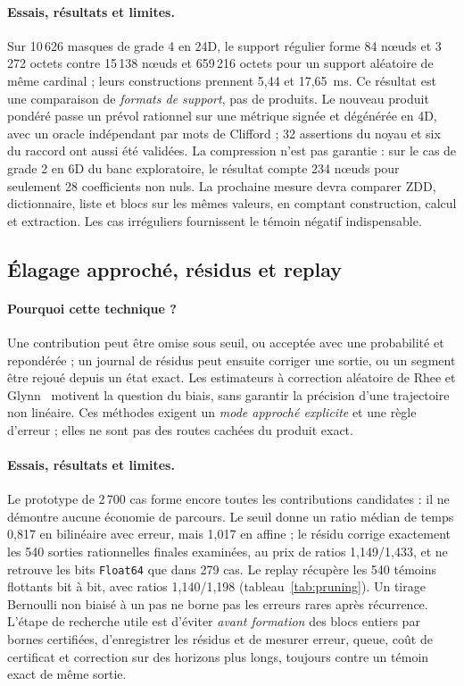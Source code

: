\documentclass[11pt,a4paper]{article}
\newcommand{\code}[1]{\texttt{#1}}
\begin{document}
\paragraph{Essais, résultats et limites.}
Sur 10\,626 masques de grade 4 en 24D, le support régulier forme
84 nœuds et 3\,272 octets contre 15\,138 nœuds et 659\,216 octets pour
un support aléatoire de même cardinal ; leurs constructions prennent
5,44 et 17,65~ms. Ce résultat est une comparaison de
\emph{formats de support}, pas de produits. Le nouveau produit pondéré passe
un prévol rationnel sur une métrique signée et dégénérée en 4D, avec un
oracle indépendant par mots de Clifford ; 32 assertions du noyau et six
du raccord ont aussi été validées. La compression n'est pas garantie :
sur le cas de grade 2 en 6D du banc exploratoire, le résultat compte
234 nœuds pour seulement 28 coefficients non nuls. La prochaine mesure
devra comparer ZDD, dictionnaire, liste et blocs sur les mêmes valeurs,
en comptant construction, calcul et extraction. Les cas irréguliers
fournissent le témoin négatif indispensable.

\subsection{Élagage approché, résidus et replay}
\paragraph{Pourquoi cette technique ?}
Une contribution peut être omise sous seuil, ou acceptée avec une probabilité
et repondérée ; un journal de résidus peut ensuite corriger une sortie, ou
un segment être rejoué depuis un état exact. Les estimateurs à correction
aléatoire de Rhee et Glynn~\cite{rhee} motivent la question du biais,
sans garantir la précision d'une trajectoire non linéaire. Ces méthodes
exigent un \emph{mode approché explicite} et une règle d'erreur ; elles
ne sont pas des routes cachées du produit exact.
\paragraph{Essais, résultats et limites.}
Le prototype de 2\,700 cas forme encore toutes les contributions candidates :
il ne démontre aucune économie de parcours. Le seuil donne un ratio médian
de temps 0,817 en bilinéaire avec erreur, mais 1,017 en affine ; le
résidu corrige exactement les 540 sorties rationnelles finales examinées,
au prix de ratios 1,149/1,433, et ne retrouve les bits \code{Float64}
que dans 279 cas. Le replay récupère les 540 témoins flottants bit à bit,
avec ratios 1,140/1,198 (tableau~\ref{tab:pruning}). Un tirage Bernoulli
non biaisé à un pas ne borne pas les erreurs rares après récurrence.
L'étape de recherche utile est d'éviter \emph{avant formation} des blocs
entiers par bornes certifiées, d'enregistrer les résidus et de mesurer erreur,
queue, coût de certificat et correction sur des horizons plus longs,
toujours contre un témoin exact de même sortie.
\end{document}
